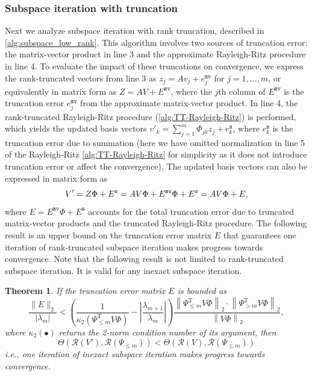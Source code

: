 \documentclass[10pt,preprint]{elsarticle}
\newtheorem{theorem}{\bf Theorem}[section]
\renewcommand{\top}{\text{T}}
\def\R{\mathcal{R}}
\newcommand{\norm}[1]{\left \lVert #1 \right \rVert }
\newcommand{\Plm}{\Psi_{\le m}}
\newcommand{\Pgm}{\Psi_{> m}}
\begin{document}
\subsubsection{Subspace iteration with truncation}

Next we analyze subspace iteration with rank truncation, described in \cref{alg:subspace_low_rank}. This algorithm involves two sources of truncation error: the matrix-vector product in line 3 and the approximate Rayleigh-Ritz procedure in line 4. 
To evaluate the impact of these truncations on convergence, we express the rank-truncated vectors from line 3 as $z_j = Av_j + e_j^{\texttt{mv}}$ for $j=1,\ldots,m$, or equivalently in matrix form as $Z = AV + E^{\texttt{mv}}$, 
where the $j$th column of $E^{\texttt{mv}}$ is the truncation error $e_j^{\texttt{mv}}$ from the approximate matrix-vector product. In line 4, the rank-truncated Rayleigh-Ritz procedure (\cref{alg:TT-Rayleigh-Ritz}) is performed, which yields the updated basis vectors $v'_k = \sum_{j=1}^{m} \Phi_{jk}z_j + e^{\texttt{s}}_k$, where $e^{\texttt{s}}_k$ is the truncation error due to summation (here we have omitted normalization in line 5 of the Rayleigh-Ritz \cref{alg:TT-Rayleigh-Ritz} for simplicity as it does not introduce truncation error or affect the convergence). The updated basis vectors can also be expressed in matrix form as 
\begin{equation}
    V' =  Z \Phi + E^{\texttt{s}} 
    = AV\Phi + E^{\texttt{mv}}\Phi + E^{\texttt{s}} \\
    = AV\Phi + E,
\end{equation}
where $E=E^{\texttt{mv}}\Phi + E^{\texttt{s}}$ accounts for the total truncation error due to truncated matrix-vector products and the truncated Rayleigh-Ritz procedure. The following result is an upper bound on the truncation error matrix $E$ that guarantees one iteration of rank-truncated subspace iteration makes progress towards convergence. Note that the following result is not limited to rank-truncated subspace iteration. It is valid for any inexact subspace iteration. 

\begin{theorem} \label{thm:sub_conv_t}
    If the truncation error matrix $E$ is bounded as 
    \begin{equation} \label{eq:sub_err_bound}
        \frac{\|E\|_2}{|\lambda_m|} < \left(\frac{1}{\kappa_2(\Psi_{\leq m}^{\top} V \Phi)} - \left|\frac{\lambda_{m+1}}{\lambda_{m}}\right|\right) \frac{\norm{\Plm^\top V \Phi}_2 \cdot \norm{\Pgm^\top V \Phi}_2}{\norm{V \Phi}_2},
    \end{equation}
    where $\kappa_2(\bullet)$ returns the 2-norm condition number of its argument, 
    then 
    \begin{equation} \label{eq:angle_bnd}
    \Theta(\R(V'),\R(\Psi_{\leq m})) < \Theta(\R(V),\R(\Psi_{\leq m}))
    \end{equation}
    i.e., one iteration of inexact subspace iteration makes progress towards convergence. 
\end{theorem}
\end{document}
